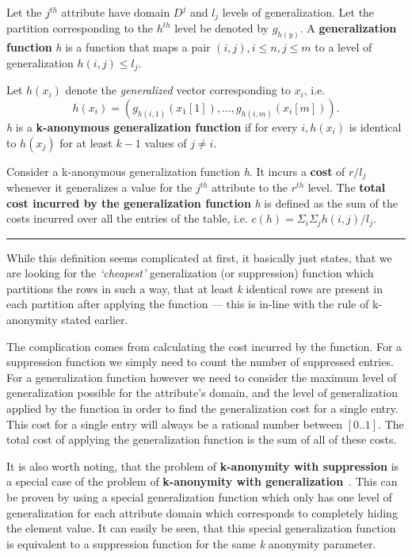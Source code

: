 Let the \(j^{th}\) attribute have domain \(D^j\) and \(l_j\) levels of generalization.
Let the partition corresponding to the \(h^{th}\) level be denoted by \(g_{h(y)}\).
A \textbf{generalization function} \textit{h} is a function that maps a pair \((i,j), i \le n, j \le m\) to a level of generalization \(h(i,j) \le l_j\).

Let \(h(x_i)\) denote the \textit{generalized} vector corresponding to \(x_i\), i.e. \[h(x_i) = (g_{h(i,1)}(x_1[1]), \ldots, g_{h(i,m)}(x_i[m])).\] \textit{h} is a \textbf{k-anonymous generalization function} if for every \(i, h(x_i)\) is identical to \(h(x_j)\) for at least \(k-1\) values of \(j \neq i\).

Consider a k-anonymous generalization function \textit{h}.
It incurs a \textbf{cost} of \(r/l_j\) whenever it generalizes a value for the \(j^{th}\) attribute to the \(r^{th}\) level.
The \textbf{total cost incurred by the generalization function} \textit{h} is defined as the sum of the costs incurred over all the entries of the table, i.e. \(c(h) = \Sigma_i\Sigma_j h(i,j)/l_j\).

\begin{center}
    \rule{0.9\textwidth}{0.3pt}
\end{center}

While this definition seems complicated at first, it basically just states, that we are looking for the \textit{`cheapest'} generalization (or suppression) function which partitions the rows in such a way, that at least \textit{k} identical rows are present in each partition after applying the function --- this is in-line with the rule of k-anonymity stated earlier.

The complication comes from calculating the cost incurred by the function.
For a suppression function we simply need to count the number of suppressed entries.
For a generalization function however we need to consider the maximum level of generalization possible for the attribute's domain, and the level of generalization applied by the function in order to find the generalization cost for a single entry.
This cost for a single entry will always be a rational  number between \([0..1]\).
The total cost of applying the generalization function is the sum of all of these costs.

It is also worth noting, that the problem of \textbf{k-anonymity with suppression} is a special case of the problem of \textbf{k-anonymity with generalization}~\cite{aggarwal}. This can be proven by using a special generalization function which only has one level of generalization for each attribute domain which corresponds to completely hiding the element value.
It can easily be seen, that this special generalization function is equivalent to a suppression function for the same \textit{k} anonymity parameter.

